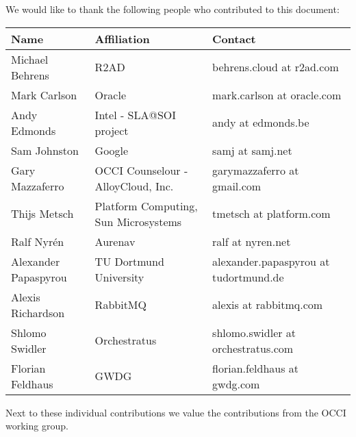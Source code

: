 
We would like to thank the following people who contributed to this
document:

\begin{tabular}{l|p{2in}|p{2in}}
Name & Affiliation & Contact \\
\hline
Michael Behrens & R2AD & behrens.cloud at r2ad.com \\
Mark Carlson & Oracle & mark.carlson at oracle.com \\
Andy Edmonds & Intel - SLA@SOI project & andy at edmonds.be \\
Sam Johnston & Google & samj at samj.net \\
Gary Mazzaferro & OCCI Counselour - AlloyCloud, Inc. &  garymazzaferro at gmail.com \\ 
Thijs Metsch & Platform Computing, Sun Microsystems & tmetsch at platform.com \\
Ralf Nyrén & Aurenav & ralf at nyren.net \\
Alexander Papaspyrou & TU Dortmund University & alexander.papaspyrou at tu\-dortmund.de \\
Alexis Richardson & RabbitMQ & alexis at rabbitmq.com \\
Shlomo Swidler & Orchestratus & shlomo.swidler at orchestratus.com \\
Florian Feldhaus & GWDG & florian.feldhaus at gwdg.com \\
\end{tabular}

Next to these individual contributions we value the contributions from
the OCCI working group.
